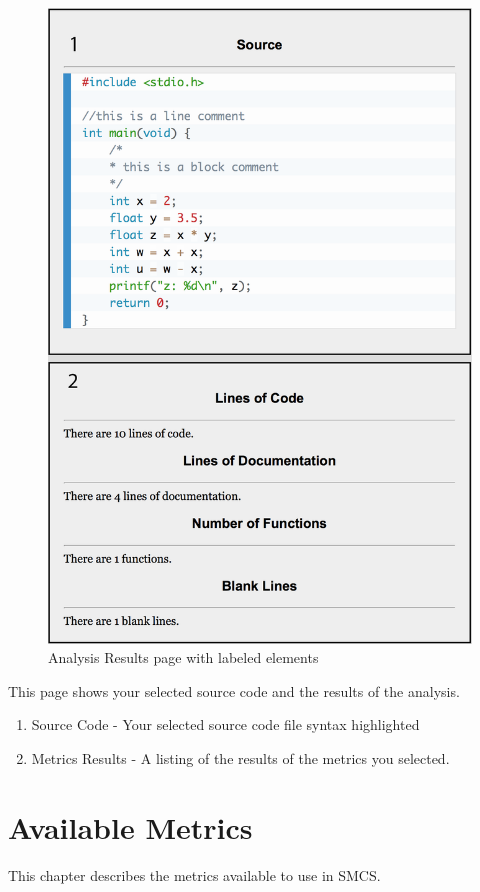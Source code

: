 \documentclass{scrreprt}
\begin{document}
	\begin{figure}[H]
		\centering
		\includegraphics[scale=0.7]{lguir.png}
		\caption{Analysis Results page with labeled elements}
	\end{figure}
	
	This page shows your selected source code and the results of the analysis.
	
	\begin{enumerate}
		\item Source Code - Your selected source code file syntax highlighted
		\item Metrics Results - A listing of the results of the metrics you selected.
	\end{enumerate}
	

	{\let\clearpage\relax \chapter{Available Metrics}}
	This chapter describes the metrics available to use in SMCS.
	
\end{document}
